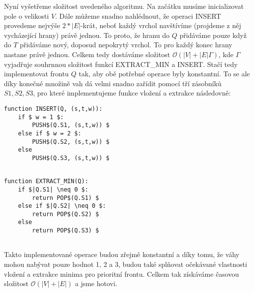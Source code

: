 \documentclass[12pt,a4paper]{article}
\theoremstyle{plain}
\begin{document}
Nyní vyšetřeme složitost uvedeného algoritmu. Na začátku musíme inicializovat pole o velikosti $ V $. Dále můžeme snadno nahlédnout, že operaci INSERT provedeme nejvýše $ 2 * |E| $-krát, neboť každý vrchol navštívíme (projdeme z něj vycházející hrany) právě jednou. To proto, že hranu do $ Q $ přidáváme pouze když do $ T $ přidáváme nový, doposud nepokrytý vrchol. To pro každý konec hrany nastane právě jednou. Celkem tedy dostáváme složitost $ \mathcal{O}(|V| + |E| \Gamma )$, kde $ \Gamma $ vyjadřuje souhrnnou složitost funkcí EXTRACT\_MIN a INSERT. Stačí tedy implementovat frontu $ Q $ tak, aby obě potřebné operace byly konstantní. To se ale díky konečné množině vah dá velmi snadno zařídit pomocí tří zásobníků $ S1, S2, S3 $, pro které implementujeme funkce vložení a extrakce následovně:
\newpage


\begin{lstlisting}[mathescape]
function INSERT(Q, (s,t,w)):
    if $ w = 1 $:
        PUSH$(Q.S1, (s,t,w)) $
    else if $ w = 2 $:
        PUSH$(Q.S2, (s,t,w)) $
    else 
        PUSH$(Q.S3, (s,t,w)) $
     
\end{lstlisting}

\begin{lstlisting}[mathescape]
function EXTRACT_MIN(Q):
    if $|Q.S1| \neq 0 $:
        return POP$(Q.S1) $
    else if $|Q.S2| \neq 0 $:
        return POP$(Q.S2) $
    else 
        return POP$(Q.S3) $
     
\end{lstlisting}

Takto implementované operace budou zřejmě konstantní a díky tomu, že váhy mohou nabývat pouze hodnot 1, 2 a 3, budou také splňovat očekávané vlastnosti vložení a extrakce minima pro prioritní frontu. Celkem tak získáváme časovou složitost $ \mathcal{O}(|V| + |E|)$ a jsme hotovi.
\end{document}
